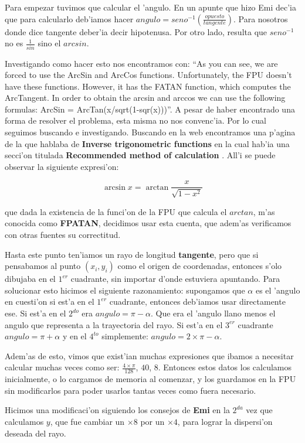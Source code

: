 \begin{enumerate}
	Para empezar tuvimos que calcular el 'angulo. En un apunte que hizo Emi
dec'ia que para calcularlo deb'iamos hacer
$angulo=seno^{-1}(\frac{opuesto}{tangente})$. Para nosotros donde dice tangente
deber'ia decir hipotenusa. Por otro lado, resulta que $seno^{-1}$ no es 
$\frac{1}{sin}$ sino el $arcsin$.

	Investigando como hacer esto nos encontramos con: ``As you can see, we are
forced to use the ArcSin and ArcCos functions. Unfortunately, the FPU doesn't
have these functions. However, it has the FATAN function, which computes the
ArcTangent. In order to obtain the arcsin and arccos we can use the following
formulas: ArcSin = ArcTan(x/sqrt(1-sqr(x)))''\cite{VLJ}. A pesar de haber
encontrado una forma de resolver el problema, esta misma no nos convenc'ia. Por
lo cual seguimos buscando e investigando. Buscando en la web encontramos una
p'agina de la \cite{WIKI} que hablaba de \textbf{Inverse trigonometric
functions} en la cual hab'ia una secci'on titulada \textbf{Recommended method
of calculation} \cite{WIKITRI}. All'i se puede observar la siguiente
expresi'on:

$$\arcsin x = \arctan \frac{x}{\sqrt{1-x^2}}$$

que dada la existencia de la funci'on de la FPU que calcula el $arctan$, m'as
conocida como \textbf{FPATAN}, decidimos usar esta cuenta, que adem'as verificamos con
otras fuentes su correctitud.

Hasta este punto ten'iamos un rayo de longitud \textbf{tangente}, pero que si
pensabamos al punto $(x_i,y_i)$ como el origen de coordenadas, entonces s'olo
dibujaba en el $1^{er}$ cuadrante, sin importar d'onde estuviera apuntando.
Para solucionar esto hicimos el siguiente razonamiento: supongamos que $\alpha$
es el 'angulo en cuesti'on si est'a en el $1^{er}$ cuadrante, entonces
deb'iamos usar directamente ese. Si est'a en el $2^{do}$ era $angulo = \pi -
\alpha$. Que era el 'angulo llano menos el angulo que representa a la
trayectoria del rayo. Si est'a en el $3^{er}$ cuadrante $angulo = \pi + \alpha$
y en el $4^{to}$ simplemente: $angulo = 2 \times \pi - \alpha$.

Adem'as de esto, vimos que exist'ian muchas expresiones que ibamos a necesitar
calcular muchas veces como ser: $\frac{4\times\pi}{128}$, $40$, $8$. Entonces
estos datos los calculamos inicialmente, o lo cargamos de memoria al comenzar,
y los guardamos en la FPU sin modificarlos para poder usarlos tantas veces como
fuera necesario.

Hicimos una modificaci'on siguiendo los consejos de \textbf{Emi} en la $2^{da}$
vez que calculamos $y$, que fue cambiar un $\times8$ por un $\times4$, para
lograr la dispersi'on deseada del rayo.


\end{enumerate}

